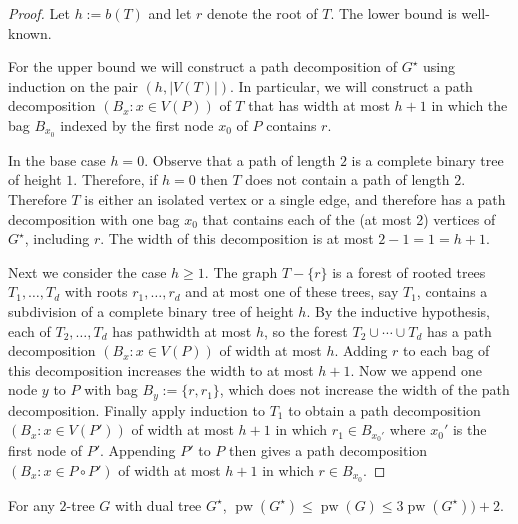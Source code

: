 \documentclass[kpfonts]{patmorin}
\DeclareMathOperator{\pw}{pw}
\begin{document}
\begin{proof}
    Let $h:=b(T)$ and let $r$ denote the root of $T$.  The lower bound is well-known.

    For the upper bound we will construct a path decomposition of $G^\star$ using induction on the pair $(h, |V(T)|)$.  In particular, we will construct a path decomposition $(B_x:x\in V(P))$ of $T$ that has width at most $h+1$ in which the bag $B_{x_0}$ indexed by the first node $x_0$ of $P$ contains $r$.

    In the base case $h=0$.  Observe that a path of length $2$ is a complete binary tree of height $1$. Therefore, if $h=0$ then $T$ does not contain a path of length $2$.  Therefore $T$ is either an isolated vertex or a single edge, and therefore has a path decomposition with one bag $x_0$ that contains each of the (at most 2) vertices of $G^\star$, including $r$.  The width of this decomposition is at most $2-1=1=h+1$.

    Next we consider the case $h\ge 1$.
    The graph $T-\{r\}$ is a forest of rooted trees $T_1,\ldots,T_d$ with roots $r_1,\ldots,r_d$ and at most one of these trees, say $T_1$, contains a subdivision of a complete binary tree of height $h$.  By the inductive hypothesis, each of $T_2,\ldots, T_d$ has pathwidth at most $h$, so the forest $T_2\cup\cdots\cup T_d$ has a path decomposition $(B_x:x\in V(P))$ of width at most $h$. Adding $r$ to each bag of this decomposition increases the width to at most $h+1$.  Now we append one node $y$ to $P$ with bag $B_y:=\{r,r_1\}$, which does not increase the width of the path decomposition.  Finally apply induction to $T_1$ to obtain a path decomposition $(B_x:x\in V(P'))$ of width at most $h+1$ in which $r_1\in B_{x_0'}$ where $x_0'$ is the first node of $P'$.  Appending $P'$ to $P$ then gives a path decomposition $(B_x:x\in P\mathbin{\circ}P')$ of width at most $h+1$ in which $r\in B_{x_0}$.
\end{proof}

\begin{lem}\label{dual_approx}
    For any $2$-tree $G$ with dual tree $G^\star$, $\pw(G^\star) \le \pw(G) \le 3\pw(G^\star)) + 2$.
\end{lem}
\end{document}
